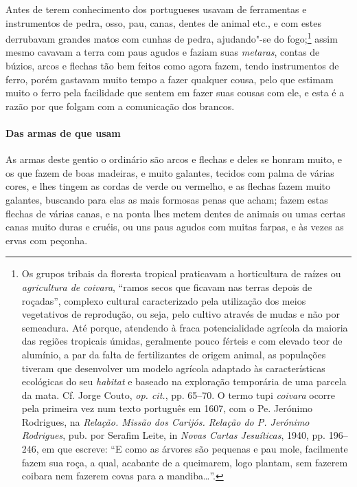  Antes de terem conhecimento dos portugueses usavam de ferramentas e
instrumentos de pedra, osso, pau, canas, dentes de animal etc., e com
estes derrubavam grandes matos com cunhas de pedra, ajudando"-se do
fogo;\footnote{ Os grupos tribais da floresta tropical praticavam a
horticultura de raízes ou \textit{agricultura de} \textit{coivara}, 
``ramos secos que ficavam nas terras depois de roçadas'', complexo
cultural caracterizado pela utilização dos meios vegetativos de
reprodução, ou seja, pelo cultivo através de mudas e não por semeadura.
Até porque, atendendo à fraca potencialidade agrícola da maioria das
regiões tropicais úmidas, geralmente pouco férteis e com elevado teor
de alumínio, a par da falta de fertilizantes de origem animal, as
populações tiveram que desenvolver um modelo agrícola adaptado às
características ecológicas do seu \textit{habitat} e baseado na
exploração temporária de uma parcela da mata. Cf. Jorge Couto, 
\textit{op. cit.}, pp. 65--70. O termo tupi \textit{coivara} ocorre pela
primeira vez num texto português em 1607, com o Pe. Jerónimo
Rodrigues, na \textit{Relação. Missão dos Carijós. Relação do P.
Jerónimo Rodrigues}, pub. por Serafim Leite, in \textit{Novas Cartas
Jesuíticas}, 1940, pp. 196--246, em que escreve: ``E como as
árvores são pequenas e pau mole, facilmente fazem sua roça, a qual,
acabante de a queimarem, logo plantam, sem fazerem coibara nem fazerem
covas para a mandiba\ldots{}''.} assim mesmo cavavam a terra com paus agudos
e faziam suas \textit{metaras}, contas de búzios, arcos e flechas tão
bem feitos como agora fazem, tendo instrumentos de ferro, porém
gastavam muito tempo a fazer qualquer cousa, pelo que estimam muito o
ferro pela facilidade que sentem em fazer suas cousas com ele, e esta é
a razão por que folgam com a comunicação dos brancos.

\paragraph{Das armas de que usam}

As armas deste gentio o ordinário são arcos e flechas e deles
se honram muito, e os que fazem de boas madeiras, e muito galantes,
tecidos com palma de várias cores, e lhes tingem as cordas de verde ou
vermelho, e as flechas fazem muito galantes, buscando para elas as mais
formosas penas que acham; fazem estas flechas de várias canas, e na
ponta lhes metem dentes de animais ou umas certas canas muito duras e
cruéis, ou uns paus agudos com muitas farpas, e às vezes as ervas com peçonha. 

